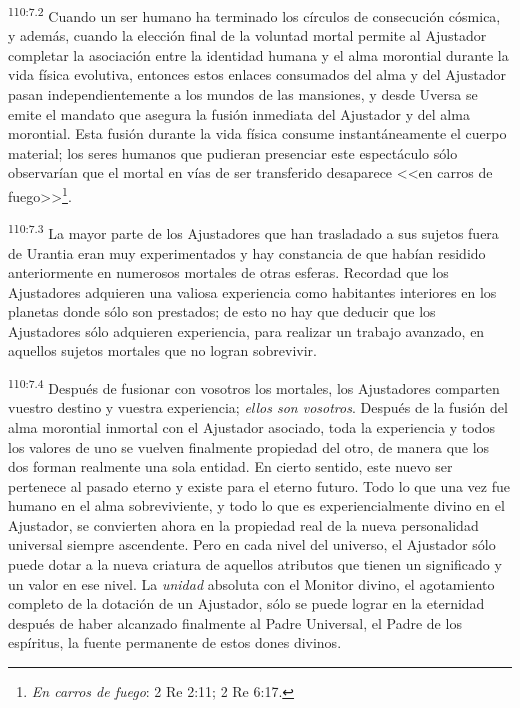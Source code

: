 \par
\textsuperscript{110:7.2} Cuando un ser humano ha terminado los círculos de consecución cósmica, y además, cuando la elección final de la voluntad mortal permite al Ajustador completar la asociación entre la identidad humana y el alma morontial durante la vida física evolutiva, entonces estos enlaces consumados del alma y del Ajustador pasan independientemente a los mundos de las mansiones, y desde Uversa se emite el mandato que asegura la fusión inmediata del Ajustador y del alma morontial. Esta fusión durante la vida física consume instantáneamente el cuerpo material; los seres humanos que pudieran presenciar este espectáculo sólo observarían que el mortal en vías de ser transferido desaparece <<en carros de fuego>>\footnote{\textit{En carros de fuego}: 2 Re 2:11; 2 Re 6:17.}.

\par
\textsuperscript{110:7.3} La mayor parte de los Ajustadores que han trasladado a sus sujetos fuera de Urantia eran muy experimentados y hay constancia de que habían residido anteriormente en numerosos mortales de otras esferas. Recordad que los Ajustadores adquieren una valiosa experiencia como habitantes interiores en los planetas donde sólo son prestados; de esto no hay que deducir que los Ajustadores sólo adquieren experiencia, para realizar un trabajo avanzado, en aquellos sujetos mortales que no logran sobrevivir.

\par
\textsuperscript{110:7.4} Después de fusionar con vosotros los mortales, los Ajustadores comparten vuestro destino y vuestra experiencia; \textit{ellos son vosotros}. Después de la fusión del alma morontial inmortal con el Ajustador asociado, toda la experiencia y todos los valores de uno se vuelven finalmente propiedad del otro, de manera que los dos forman realmente una sola entidad. En cierto sentido, este nuevo ser pertenece al pasado eterno y existe para el eterno futuro. Todo lo que una vez fue humano en el alma sobreviviente, y todo lo que es experiencialmente divino en el Ajustador, se convierten ahora en la propiedad real de la nueva personalidad universal siempre ascendente. Pero en cada nivel del universo, el Ajustador sólo puede dotar a la nueva criatura de aquellos atributos que tienen un significado y un valor en ese nivel. La \textit{unidad} absoluta con el Monitor divino, el agotamiento completo de la dotación de un Ajustador, sólo se puede lograr en la eternidad después de haber alcanzado finalmente al Padre Universal, el Padre de los espíritus, la fuente permanente de estos dones divinos.

